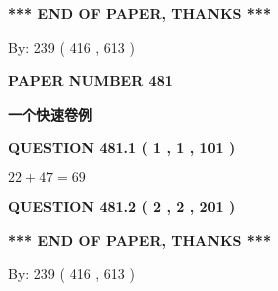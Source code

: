 \documentclass{ctexart}
\begin{document}
   
 \vspace{0.2in}
 
   
   
   
   
\vspace{1.0in} 
{\textbf{\large{ *** END OF PAPER, THANKS *** }}} 
   
   
\hspace{1.0in} By: 
 239 ( 416 ,  613 )
   
   
   
   
\newpage 
\setcounter{page}{ 
   481001 } 
   
   
   
   
 {\textbf{ \Large{ PAPER NUMBER  481  }}}
   
   
\vspace{0.2in}
   
   
   
   
   
   
 \vspace{0.2in}
{\LARGE {\textbf{ 一个快速卷例}}}
   
   
  
\vspace{0.2in}
  
{\textbf{\Large{QUESTION
481.1 
 ( 1 , 1 , 101 )
}}}
  
  
 
 

$ %
22 +  %
47=   %
69$
 
 
  
\vspace{0.2in}
  
{\textbf{\Large{QUESTION
481.2 
 ( 2 , 2 , 201 )
}}}
  
  
   
   
 \vspace{0.2in}
 
   
   
   
   
\vspace{1.0in} 
{\textbf{\large{ *** END OF PAPER, THANKS *** }}} 
   
   
\hspace{1.0in} By: 
 239 ( 416 ,  613 )
   
   
   
   
\newpage 
\setcounter{page}{ 
   482001 } 
   
   
   
\end{document}
